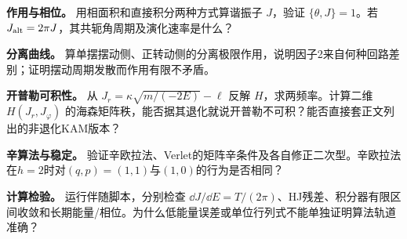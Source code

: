 \begin{bookexercises}
\item {} \textbf{作用与相位。} 用相面积和直接积分两种方式算谐振子 $J$，验证 $\{\theta,J\}=1$。若 $J_{\rm alt}=2\pi J$，其共轭角周期及演化速率是什么？
\item {} \textbf{分离曲线。} 算单摆摆动侧、正转动侧的分离极限作用，说明因子2来自何种回路差别；证明摆动周期发散而作用有限不矛盾。
\item {} \textbf{开普勒可积性。} 从 $J_r=\kappa\sqrt{m/(-2E)}-\ell$ 反解 $H$，求两频率。计算二维 $H(J_r,J_\varphi)$ 的海森矩阵秩，能否据其退化就说开普勒不可积？能否直接套正文列出的非退化KAM版本？
\item {} \textbf{辛算法与稳定。} 验证辛欧拉法、Verlet的矩阵辛条件及各自修正二次型。辛欧拉法在$h=2$时对$(q,p)=(1,1)$与$(1,0)$的行为是否相同？
\item {} \textbf{计算检验。} 运行伴随脚本，分别检查 $\dd J/\dd E=T/(2\pi)$、HJ残差、积分器有限区间收敛和长期能量/相位。为什么低能量误差或单位行列式不能单独证明算法轨道准确？
\end{bookexercises}

